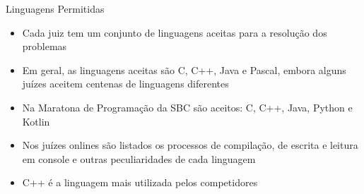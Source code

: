 \begin{frame}[fragile]{Linguagens Permitidas}

    \begin{itemize}
        \item  Cada  juiz tem um conjunto de linguagens aceitas para a resolução dos problemas
        \item Em geral, as linguagens aceitas são C, C++, Java e Pascal, embora alguns juízes aceitem centenas de linguagens diferentes
        \item Na Maratona de Programação da SBC são aceitos: C, C++, Java, Python e Kotlin
        \item Nos juízes onlines são listados os processos de compilação, de escrita e leitura em 
        console e outras peculiaridades de cada linguagem
        \item C++ é a linguagem mais utilizada pelos competidores
    \end{itemize}

\end{frame}
